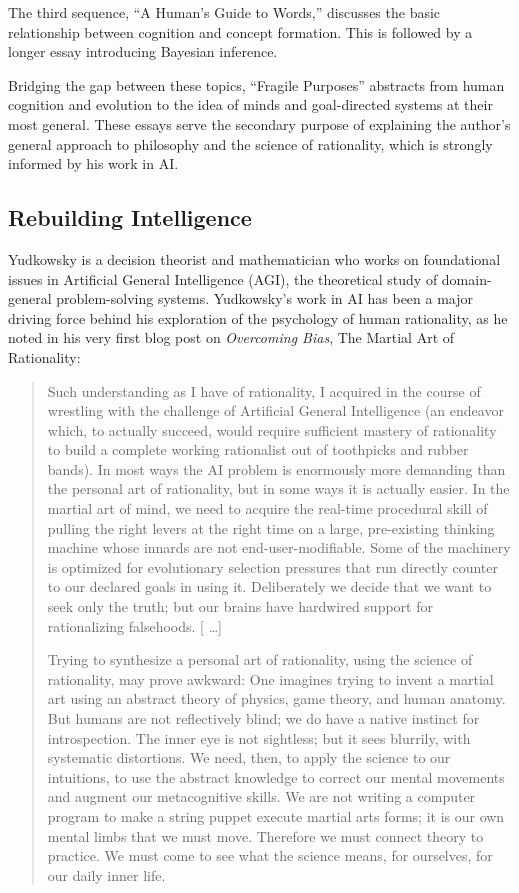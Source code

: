 {
 The third sequence, ``A Human's
Guide to Words,'' discusses the basic relationship
between cognition and concept formation. This is followed by a longer
essay introducing Bayesian inference.}

{
 Bridging the gap between these topics, ``Fragile
Purposes'' abstracts from human cognition and
evolution to the idea of minds and goal-directed systems at their most
general. These essays serve the secondary purpose of explaining the
author's general approach to philosophy and the science
of rationality, which is strongly informed by his work in AI.}

\subsection{Rebuilding Intelligence}

{
 Yudkowsky is a decision theorist and mathematician who works on
foundational issues in Artificial General Intelligence (AGI), the
theoretical study of domain-general problem-solving systems.
Yudkowsky's work in AI has been a major driving force
behind his exploration of the psychology of human rationality, as he
noted in his very first blog post on \textit{Overcoming Bias}, The
Martial Art of Rationality:}

\begin{quotation}
{
 Such understanding as I have of rationality, I acquired in the
course of wrestling with the challenge of Artificial General
Intelligence (an endeavor which, to actually succeed, would require
sufficient mastery of rationality to build a complete working
rationalist out of toothpicks and rubber bands). In most ways the AI
problem is enormously more demanding than the personal art of
rationality, but in some ways it is actually easier. In the martial art
of mind, we need to acquire the real-time procedural skill of pulling
the right levers at the right time on a large, pre-existing thinking
machine whose innards are not end-user-modifiable. Some of the
machinery is optimized for evolutionary selection pressures that run
directly counter to our declared goals in using it. Deliberately we
decide that we want to seek only the truth; but our brains have
hardwired support for rationalizing falsehoods. [ \ldots ]}

{
 Trying to synthesize a personal art of rationality, using the
science of rationality, may prove awkward: One imagines trying to
invent a martial art using an abstract theory of physics, game theory,
and human anatomy. But humans are not reflectively blind; we do have a
native instinct for introspection. The inner eye is not sightless; but
it sees blurrily, with systematic distortions. We need, then, to apply
the science to our intuitions, to use the abstract knowledge to correct
our mental movements and augment our metacognitive skills. We are not
writing a computer program to make a string puppet execute martial arts
forms; it is our own mental limbs that we must move. Therefore we must
connect theory to practice. We must come to see what the science means,
for ourselves, for our daily inner life.}
\end{quotation}

